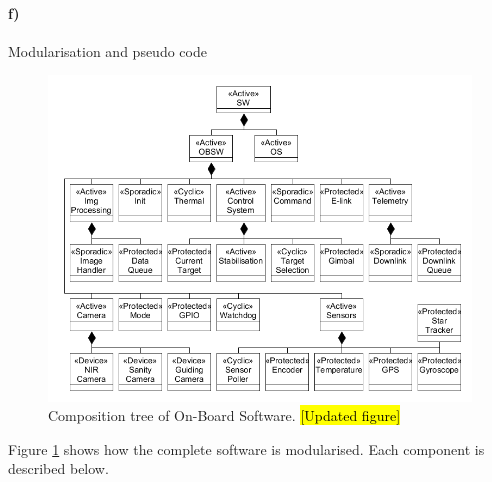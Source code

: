 \clearpage
\paragraph{f)} Modularisation and pseudo code

\begin{figure}[H]
	\centering
	\includegraphics[width=\textwidth]{4-experiment-design/img/software/composition-tree.png}
	\caption{Composition tree of On-Board Software. \hl{[Updated figure]}}
	\label{fig:software-composition-tree}
\end{figure}

Figure \ref{fig:software-composition-tree} shows how the complete software is modularised. Each component is described below.

